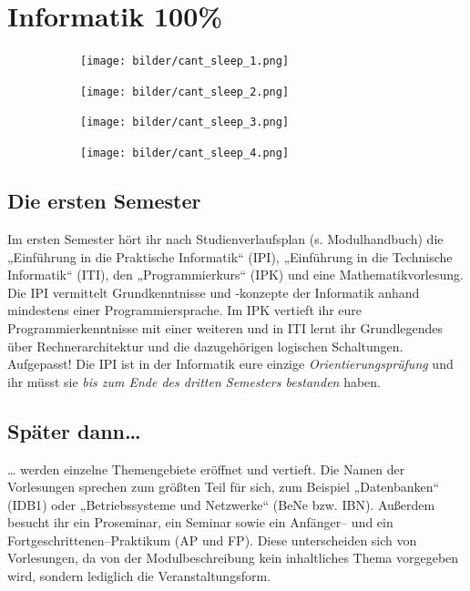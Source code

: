\section{Informatik 100\%}

\begin{figure}[th]
    \begin{subfigure}{.23\textwidth}
	    \texttt{[image: bilder/cant\_sleep\_1.png]}
    \end{subfigure}
    \hfill
    \begin{subfigure}{.23\textwidth}
	    \texttt{[image: bilder/cant\_sleep\_2.png]}
    \end{subfigure}
    \hfill
    \begin{subfigure}{.23\textwidth}
	    \texttt{[image: bilder/cant\_sleep\_3.png]}
    \end{subfigure}
    \hfill
    \begin{subfigure}{.23\textwidth}
	    \texttt{[image: bilder/cant\_sleep\_4.png]}
    \end{subfigure}

\end{figure}

\subsection{Die ersten Semester}

Im ersten Semester hört ihr nach Studienverlaufsplan (s. Modulhandbuch) die „Einführung in die Praktische Informatik“ (\gls{IPI}), „Einführung in die Technische Informatik“ (\gls{ITI}), den „Programmierkurs“ (\gls{IPK}) und eine Mathematikvorlesung. Die IPI vermittelt Grundkenntnisse und -konzepte der Informatik anhand mindestens einer Programmiersprache. Im IPK vertieft ihr eure Programmierkenntnisse mit einer weiteren und in ITI lernt ihr Grundlegendes über Rechnerarchitektur und die dazugehörigen logischen Schaltungen. Aufgepasst! Die IPI ist in der Informatik eure einzige \emph{Orientierungsprüfung} und ihr müsst sie \emph{bis zum Ende des dritten Semesters bestanden} haben.


\subsection{Später dann\dots{}}

\dots{} werden einzelne Themengebiete eröffnet und vertieft. Die Namen der Vorlesungen sprechen zum größten Teil für sich, zum Beispiel „Datenbanken“ (\gls{IDB1}) oder „Betriebssysteme und Netzwerke“ (\gls{BeNe} bzw. IBN). Außerdem besucht ihr ein Proseminar, ein Seminar sowie ein An\-fän\-ger-- und ein Fortgeschrittenen--Praktikum (\gls{AP} und \gls{FP}). Diese unterscheiden sich von Vorlesungen, da von der Modulbeschreibung kein inhaltliches Thema vorgegeben wird, sondern lediglich die Veranstaltungsform.

